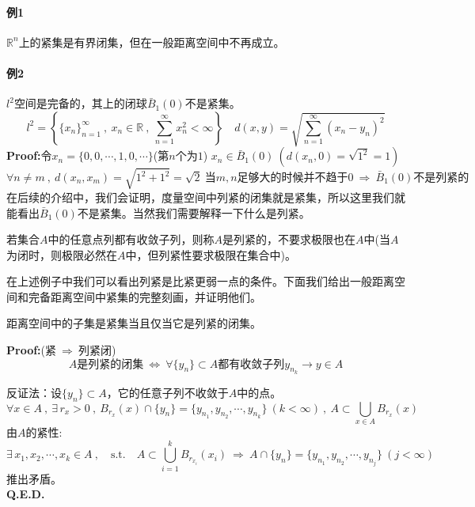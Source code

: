 \paragraph*{例1} $\mathbb{R}^n$上的紧集是有界闭集，但在一般距离空间中不再成立。

\paragraph*{例2} $l^2$空间是完备的，其上的闭球$\bar{B}_1(0)$不是紧集。
\[l^2=\left\{\{x_n\}_{n=1}^{\infty} \ , \ x_n \in \mathbb{R} \ , \ \sum_{n=1}^{\infty}x_n^2<\infty\right\} \quad d(x,y)=\sqrt{\sum_{n=1}^{\infty}(x_n-y_n)^2}\]
\textbf{Proof:}令$x_n=\{0,0,\cdots,1,0,\cdots\}$(第$n$个为$1$) \quad $x_n \in \bar{B}_1(0) \ (d(x_n,0)=\sqrt{1^2}=1)$
\[\forall n \neq m \ , \ d(x_n,x_m)=\sqrt{1^2+1^2}=\sqrt{2} \ \text{当$m,n$足够大的时候并不趋于0} \ \Rightarrow \ \bar{B}_1(0)\text{不是列紧的}\]
在后续的介绍中，我们会证明，度量空间中列紧的闭集就是紧集，所以这里我们就能看出$\bar{B}_1(0)$不是紧集。当然我们需要解释一下什么是列紧。
\begin{definition}[(相对)列紧性]
    若集合$A$中的任意点列都有收敛子列，则称$A$是列紧的，不要求极限也在$A$中(当$A$为闭时，则极限必然在$A$中，但列紧性要求极限在集合中)。
\end{definition}
在上述例子中我们可以看出列紧是比紧更弱一点的条件。下面我们给出一般距离空间和完备距离空间中紧集的完整刻画，并证明他们。
\begin{theorem}
    距离空间中的子集是紧集当且仅当它是列紧的闭集。
\end{theorem}
\textbf{Proof:}(紧$ \ \Rightarrow \ $列紧闭)
\[A \text{是列紧的闭集} \ \Leftrightarrow \ \forall\{y_n\} \subset A\text{都有收敛子列}y_{n_k} \to y \in A\]

反证法：设$\{y_n\} \subset A$，它的任意子列不收敛于$A$中的点。
\[\forall x \in A \ , \ \exists \, r_x>0 \ , \ B_{r_x}(x) \cap \{y_n\}=\{y_{n_1},y_{n_2},\cdots,y_{n_k}\} \ (k<\infty) \ , \ A \subset \bigcup_{x\in A}B_{r_x}(x)\]
由$A$的紧性:
\[\exists \, x_1,x_2,\cdots,x_k \in A \ , \quad \text{s.t.} \quad A \subset \bigcup_{i=1}^kB_{r_{x_i}}(x_i) \ \Rightarrow \ A \cap \{y_n\}=\{y_{n_1},y_{n_2},\cdots,y_{n_j}\} \ (j<\infty)\]
推出矛盾。\\
\textbf{Q.E.D.}

